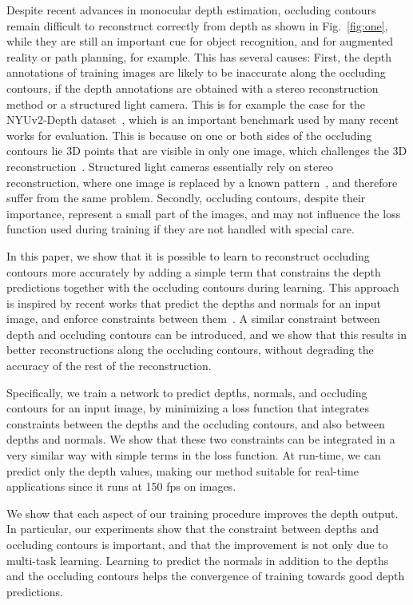 \documentclass[10pt,twocolumn,letterpaper]{article}
\begin{document}
Despite recent advances in monocular depth estimation, occluding contours 
remain difficult to reconstruct correctly from depth as shown in 
Fig.~\ref{fig:one}, while they are still an important cue for object 
recognition, and for augmented reality or path planning, for example.  
This has several causes: First, the  depth annotations  of training  
images are  likely to  be inaccurate along the  occluding contours, if the 
depth  annotations are obtained with a stereo reconstruction method or a 
structured light  camera.  This is for example the case for the NYUv2-Depth 
dataset~\cite{Nyuv2}, which is an important benchmark used by many  recent 
works for evaluation. This is because on one or both sides of the occluding 
contours lie 3D points that are visible in only one image, which challenges the 
3D reconstruction~\cite{Szeliski11}. Structured light cameras essentially rely  
on stereo reconstruction, where one  image is replaced by a known 
pattern~\cite{Han13},  and therefore suffer  from the  same problem. Secondly, 
occluding contours, despite their  importance, represent a small part of the 
images, and may not influence the loss function used during training if they 
are not handled with special care.

In  this paper,  we  show that  it  is  possible to  learn to reconstruct 
occluding contours more accurately by adding a simple term that constrains the 
depth predictions together with the occluding contours during learning.  This 
approach is inspired  by recent works  that predict the depths  and normals 
for  an input image, and enforce constraints between 
them~\cite{WangSurgeNIPS16,Qi2018GeoNetGN,Yang2018lego}.  A similar constraint 
between depth and occluding contours can be introduced, and we show that 
this results in better reconstructions  along the  occluding  contours,  
without degrading  the accuracy of the rest of the reconstruction.

Specifically, we  train a  network to  predict depths,  normals, and  occluding
contours  for an  input image,  by minimizing  a loss function that integrates
constraints between the depths and the  occluding contours, and also between 
depths and normals. We show that  these two constraints can be integrated in
a very similar way with simple terms  in the loss function.  At run-time, we can
predict  only  the  depth  values,  making our  method suitable for real-time 
applications since it runs at 150 fps on  images.

We show  that each aspect of  our training procedure improves  the depth output.
In  particular, our  experiments show  that  the constraint  between depths  and
occluding contours is  important, and that the improvement is not only due to 
multi-task learning.
Learning to  predict the normals in addition to  the depths and the occluding  
contours  helps  the  convergence  of  training  towards  good  depth
predictions.
\end{document}

